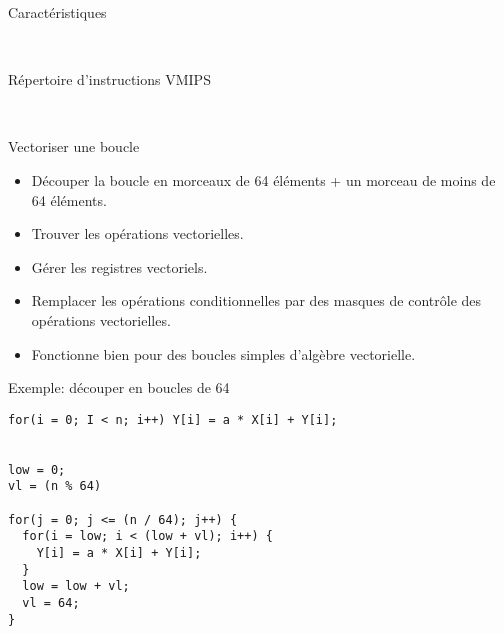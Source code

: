 \documentclass[10pt]{beamer}
\begin{document}
\begin{frame}[fragile]{Caractéristiques}

  \begin{center} %
     \\
  \end{center}
\end{frame}

\begin{frame}[fragile]{Répertoire d'instructions VMIPS}

  \begin{center} %
     \\
  \end{center}
\end{frame}

\begin{frame}{Vectoriser une boucle}

  \begin{itemize}
    \item Découper la boucle en morceaux de 64 éléments + un morceau de moins de 64 éléments.

    \item Trouver les opérations vectorielles.

    \item Gérer les registres vectoriels.

    \item Remplacer les opérations conditionnelles par des masques de contrôle des opérations vectorielles.

    \item Fonctionne bien pour des boucles simples d'algèbre vectorielle.
  \end{itemize}
\end{frame}

\begin{frame}[fragile]{Exemple: découper en boucles de 64}

   \begin{verbatim}
for(i = 0; I < n; i++) Y[i] = a * X[i] + Y[i];


low = 0;
vl = (n % 64)

for(j = 0; j <= (n / 64); j++) {
  for(i = low; i < (low + vl); i++) {
    Y[i] = a * X[i] + Y[i];
  }
  low = low + vl;
  vl = 64;
}
  \end{verbatim}
\end{frame}
\end{document}
